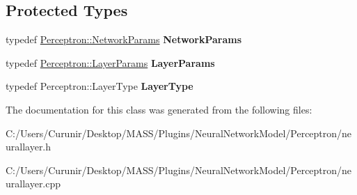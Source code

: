\subsection*{Protected Types}
\begin{DoxyCompactItemize}
\item 
\mbox{\label{class_neural_layer_ac3d37a368a77b07386981ecd0e0e55bb}} 
typedef \hyperlink{struct_perceptron_1_1_network_params}{Perceptron\+::\+Network\+Params} {\bfseries Network\+Params}
\item 
\mbox{\label{class_neural_layer_a9a46b30c0d9d329e3d2d943ae628683f}} 
typedef \hyperlink{struct_perceptron_1_1_layer_params}{Perceptron\+::\+Layer\+Params} {\bfseries Layer\+Params}
\item 
\mbox{\label{class_neural_layer_a236cebae478f3f55e8256ce1b554bcb3}} 
typedef Perceptron\+::\+Layer\+Type {\bfseries Layer\+Type}
\end{DoxyCompactItemize}


The documentation for this class was generated from the following files\+:\begin{DoxyCompactItemize}
\item 
C\+:/\+Users/\+Curunir/\+Desktop/\+M\+A\+S\+S/\+Plugins/\+Neural\+Network\+Model/\+Perceptron/neurallayer.\+h\item 
C\+:/\+Users/\+Curunir/\+Desktop/\+M\+A\+S\+S/\+Plugins/\+Neural\+Network\+Model/\+Perceptron/neurallayer.\+cpp\end{DoxyCompactItemize}
